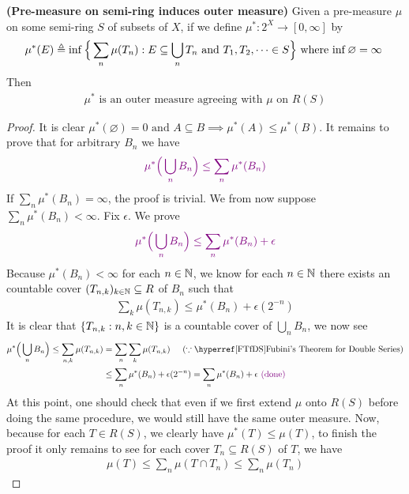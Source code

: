 \documentclass{report}
\begin{document}
\begin{theorem}
\label{Piom}
\textbf{(Pre-measure on semi-ring induces outer measure)} Given a pre-measure $\mu$ on some semi-ring $S$ of subsets of $X$, if we define $\mu^*:2^X\rightarrow [0,\infty]$ by
\begin{align*}
\mu^*(E)\triangleq \inf \Big\{ \sum_n \mu (T_n):E \subseteq \bigcup _n T_n\text{ and }T_1,T_2,\dots \in S \Big\}\text{ where $\inf \varnothing= \infty$ }
\end{align*}
Then 
\begin{align*}
  \mu^*\text{ is an outer measure agreeing with $\mu$ on $R(S)$}
\end{align*}
\end{theorem}
\begin{proof}
  It is clear $\mu^*(\varnothing)=0\text{ and }A\subseteq B \implies \mu^*(A)\leq \mu^*(B)$. It remains to prove that for arbitrary $B_n$ we have 
\begin{align*}
  \textcolor{violet}{\mu^* \Big(\bigcup_n B_n \Big)  \leq \sum_n \mu^* (B_n)}
\end{align*}
If  $\sum_n \mu^*(B_n)=\infty$, the proof is trivial. We from now suppose $\sum_n \mu^*(B_n)< \infty$. Fix $\epsilon $. We prove 
\begin{align*}
  \textcolor{violet}{\mu^*\Big(\bigcup _n B_n \Big)\leq \sum_n \mu^* (B_n)+\epsilon }
\end{align*}
Because $\mu^*(B_n)<\infty$ for each $n\in\mathbb{N}$, we know for each $n\in\mathbb{N}$ there exists an countable cover $(T_{n,k})_{k\in\mathbb{N}}\subseteq R$ of $B_n$ such that 
\begin{align*}
\sum_k \mu (T_{n,k}) \leq \mu^*(B_n)+\epsilon (2^{-n}) 
\end{align*}
It is clear that  $\{ T_{n,k}:n,k \in\mathbb{N} \}$ is a countable cover of $\bigcup_n B_n$, we now see 
\begin{align*}
  \mu^*\Big(\bigcup_n B_n \Big)\leq  \sum_{n,k} \mu (T_{n,k})&= \sum_n \sum_k \mu(T_{n,k})\hspace{0.5cm}(\because \text{\customref{FTfDS}{Fubini's Theorem for Double Series}})\\
&\leq \sum_n \mu^*(B_n)+ \epsilon (2^{-n})= \sum_n \mu^*(B_n)+ \epsilon \vdone
\end{align*}
At this point, one should check that even if we first extend $\mu$ onto $R(S)$ before doing the same procedure, we would still have the same outer measure. Now, because for each $T \in R(S)$, we clearly have $\mu^*(T)\leq \mu (T)$, to finish the proof it only remains to see for each cover $T_n \subseteq R(S)$ of $T$, we have
\begin{align*}
\mu (T)\leq \sum_n \mu (T\cap T_n)\leq \sum_n \mu (T_n)
\end{align*}
\end{proof}
\end{document}

